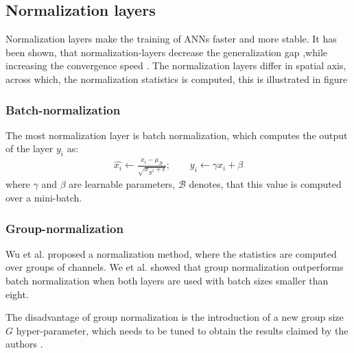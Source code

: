 \subsection{Normalization layers}
\label{sec:normalization_layers}
Normalization layers make the training of ANNs faster and more stable. It has been shown, that normalization-layers decrease the generalization gap ,while increasing the convergence speed \cite{Ioffe2015,Wu2018}. The normalization layers differ in spatial axis, across which, the normalization statistics is computed, this is illustrated in figure
\subsubsection{Batch-normalization}
The most normalization layer is batch normalization, which computes the output of the layer $y_i$ as:
\begin{align}
    \hat{x_i} \leftarrow \frac{x_i - \mu_{\mathcal{B}}}{\sqrt{ \sigma _{\mathcal{B}^2} + \epsilon}}; \qquad y_i \leftarrow \gamma \hat{x_i} + \beta
\end{align}
where $\gamma$ and $\beta$ are learnable parameters, $\mathcal{B}$ denotes, that this value is computed over a mini-batch.


\subsubsection{Group-normalization}
\label{sec:group_norm}
Wu et al. \cite{Wu2018} proposed a normalization method, where the statistics are computed over groups of channels. We et al. showed that group normalization outperforms batch normalization when both layers are used with batch sizes smaller than eight.

The disadvantage of group normalization is the introduction of a new group size $G$ hyper-parameter, which needs to be tuned to obtain the results claimed by the authors \cite{Wu2018}.

